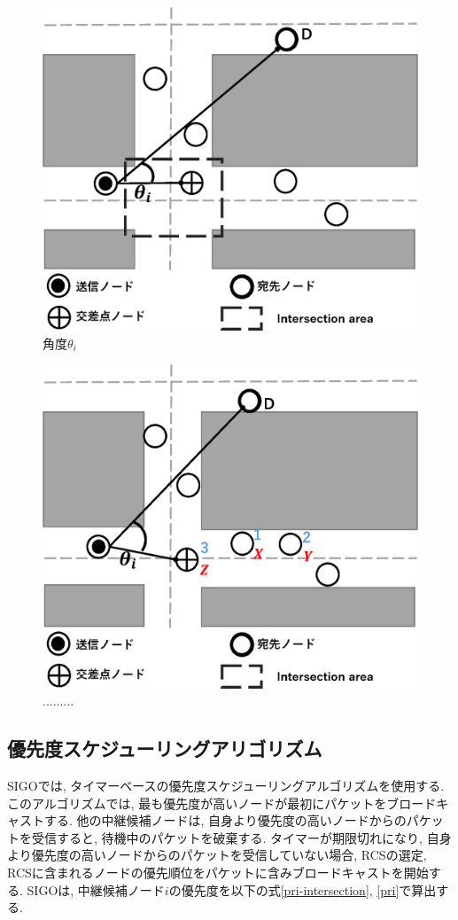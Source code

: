 \documentclass[10pt]{jreport}
\begin{document}
\begin{figure}[!ht]
	\centering
	\includegraphics[width=120mm]{figures/angle.eps}
	\caption{角度$\theta_i$}
	\label{fig:angle}
\end{figure}

\begin{figure}[!ht]
	\centering
	\includegraphics[width=120mm]{figures/aim_SIGO.eps}
	\caption{.........}
	\label{fig:aim_SIGO}
\end{figure}




\subsection{優先度スケジューリングアリゴリズム}
\label{SIGO_priority}
SIGOでは, タイマーベースの優先度スケジューリングアルゴリズムを使用する. このアルゴリズムでは, 最も優先度が高いノードが最初にパケットをブロードキャストする. 他の中継候補ノードは, 自身より優先度の高いノードからのパケットを受信すると, 待機中のパケットを破棄する. タイマーが期限切れになり, 自身より優先度の高いノードからのパケットを受信していない場合, RCSの選定, RCSに含まれるノードの優先順位をパケットに含みブロードキャストを開始する. SIGOは, 中継候補ノード$i$の優先度を以下の式\ref{pri-intersection}, \ref{pri}で算出する.
\end{document}
